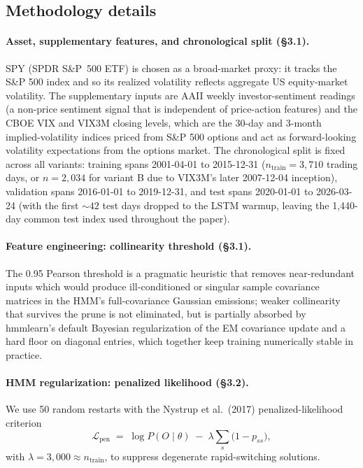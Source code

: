 \documentclass{article}
\begin{document}
\subsection{Methodology details}
\label{app:methodology-details}

\paragraph{Asset, supplementary features, and chronological split (\S 3.1).} SPY (SPDR S\&P~500 ETF) is chosen as a broad-market proxy: it tracks the S\&P 500 index and so its realized volatility reflects aggregate US equity-market volatility. The supplementary inputs are AAII weekly investor-sentiment readings (a non-price sentiment signal that is independent of price-action features) and the CBOE VIX and VIX3M closing levels, which are the 30-day and 3-month implied-volatility indices priced from S\&P 500 options and act as forward-looking volatility expectations from the options market. The chronological split is fixed across all variants: training spans 2001-04-01 to 2015-12-31 ($n_{\text{train}} = 3{,}710$ trading days, or $n = 2{,}034$ for variant B due to VIX3M's later 2007-12-04 inception), validation spans 2016-01-01 to 2019-12-31, and test spans 2020-01-01 to 2026-03-24 (with the first ${\sim}42$ test days dropped to the LSTM warmup, leaving the 1{,}440-day common test index used throughout the paper).

\paragraph{Feature engineering: collinearity threshold (\S 3.1).} The 0.95 Pearson threshold is a pragmatic heuristic that removes near-redundant inputs which would produce ill-conditioned or singular sample covariance matrices in the HMM's full-covariance Gaussian emissions; weaker collinearity that survives the prune is not eliminated, but is partially absorbed by hmmlearn's default Bayesian regularization of the EM covariance update and a hard floor on diagonal entries, which together keep training numerically stable in practice.

\paragraph{HMM regularization: penalized likelihood (\S 3.2).} We use 50 random restarts with the Nystrup et al.\ (2017) penalized-likelihood criterion
\[
\mathcal L_{\text{pen}} \;=\; \log P(O \mid \theta) \;-\; \lambda \sum_{s} \bigl(1 - p_{ss}\bigr),
\]
with $\lambda = 3{,}000 \approx n_{\text{train}}$, to suppress degenerate rapid-switching solutions.
\end{document}
